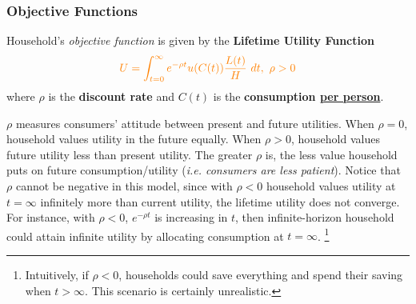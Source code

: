 \documentclass[11pt]{article}
\begin{document}
	\subsubsection{Objective Functions}
	\par Household's \emph{objective function} is given by the \textbf{Lifetime Utility Function}
	\begin{equation}
		\textcolor{orange}{
			U = \int_{t=0}^\infty {e^{-\rho t} u(C(t)) \frac{L(t)}{H}}\ dt,\ \rho > 0
		}
	\end{equation}
	where $\rho$ is the \textbf{discount rate} and $C(t)$ is the \textbf{consumption \ul{per person}}.
	\begin{remark}
		$\rho$ measures consumers' attitude between present and future utilities.
		When $\rho = 0$, household values utility in the future equally. 
		When $\rho > 0$, household values future utility less than present utility.
		The greater $\rho$ is, the less value household puts on future consumption/utility (\emph{i.e. consumers are less patient}).
		Notice that $\rho$ cannot be negative in this model, since with $\rho < 0$ household values utility at $t=\infty$ infinitely more than current utility, the lifetime utility does not converge. For instance, with $\rho < 0$, $e^{-\rho t}$ is increasing in $t$, then infinite-horizon household could attain infinite utility by allocating consumption at $t=\infty$.
		\footnote{Intuitively, if $\rho < 0$, households could save everything and spend their saving when $t > \infty$. This scenario is certainly unrealistic.}
	\end{remark}
	
\end{document}
